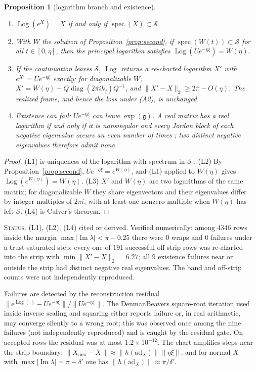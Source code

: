 \documentclass[11pt]{article}
\newtheorem{proposition}[theorem]{Proposition}
\theoremstyle{definition}
\theoremstyle{remark}
\newcommand{\g}{\mathfrak{g}}
\newcommand{\ad}{\mathrm{ad}}
\newcommand{\Log}{\operatorname{Log}}
\newcommand{\Imag}{\operatorname{Im}}
\newcommand{\spec}{\operatorname{spec}}
\newcommand{\ndash}{\textendash}
\newcommand{\status}[1]{\par\smallskip\noindent\textsc{Status.} #1\par\smallskip}
\begin{document}
\begin{proposition}[logarithm branch and existence]\label{prop:branch}
\begin{enumerate}
\item[(L1)] $\Log(e^X)=X$ if and only if $\spec(X)\subset\mathcal{S}$.
\item[(L2)] With $W$ the solution of Proposition~\ref{prop:second}, if $\spec(W(t))\subset\mathcal{S}$ for all $t\in[0,\eta]$, then the principal logarithm satisfies $\Log(Ue^{-\eta\xi})=W(\eta)$.
\item[(L3)] If the continuation leaves $\mathcal{S}$, $\Log$ returns a re-charted logarithm $X'$ with $e^{X'}=Ue^{-\eta\xi}$ exactly; for diagonalizable $W$, $X'=W(\eta)-Q\operatorname{diag}(2\pi ik_j)Q^{-1}$, and $\|X'-X\|_2\ge2\pi-O(\eta)$. The realized frame, and hence the loss under (A2), is unchanged.
\item[(L4)] Existence can fail: $Ue^{-\eta\xi}$ can leave $\exp(\g)$. A real matrix has a real logarithm if and only if it is nonsingular and every Jordan block of each negative eigenvalue occurs an even number of times \cite{Culver1966}; two distinct negative eigenvalues therefore admit none.
\end{enumerate}
\end{proposition}
\begin{proof}
(L1) is uniqueness of the logarithm with spectrum in $\mathcal{S}$ \cite[Thm.~1.31]{Higham2008}. (L2) By Proposition~\ref{prop:second}, $Ue^{-\eta\xi}=e^{W(\eta)}$, and (L1) applied to $W(\eta)$ gives $\Log(e^{W(\eta)})=W(\eta)$. (L3) $X'$ and $W(\eta)$ are two logarithms of the same matrix; for diagonalizable $W$ they share eigenvectors and their eigenvalues differ by integer multiples of $2\pi i$, with at least one nonzero multiple when $W(\eta)$ has left $\mathcal{S}$. (L4) is Culver's theorem.
\end{proof}
\status{(L1), (L2), (L4) cited or derived. Verified numerically: among $4346$ rows inside the margin $\max|\Imag \lambda|<\pi-0.25$ there were $0$ wraps and $0$ failures under a trust-saturated step; every one of $191$ successful off-strip rows was re-charted into the strip with $\min\|X'-X\|_2=6.27$; all $9$ existence failures near or outside the strip had distinct negative real eigenvalues. The band and off-strip counts were not independently reproduced.}

Failures are detected by the reconstruction residual $\|e^{\Log(\cdot)}-Ue^{-\eta\xi}\|/\|Ue^{-\eta\xi}\|$. The Denman\ndash Beavers square-root iteration \cite{DenmanBeavers1976} used inside inverse scaling and squaring either reports failure or, in real arithmetic, may converge silently to a wrong root; this was observed once among the nine failures (not independently reproduced) and is caught by the residual gate. On accepted rows the residual was at most $1.2\times10^{-12}$. The chart amplifies steps near the strip boundary: $\|X_{\mathrm{new}}-X\|\approx\|h(\ad_X)\|\|\eta\xi\|$, and for normal $X$ with $\max|\Imag \lambda|=\pi-\delta'$ one has $\|h(\ad_X)\|\approx\pi/\delta'$.
\end{document}
